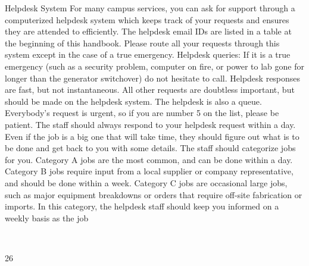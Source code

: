 \documentclass[a4paper,10pt]{article}
\begin{document}
Helpdesk System
For many campus services, you can ask for support through a computerized helpdesk system
which keeps track of your requests and ensures they are attended to efficiently. The
helpdesk email IDs are listed in a table at the beginning of this handbook. Please route all
your requests through this system except in the case of a true emergency.
Helpdesk queries: If it is a true emergency (such as a security problem, computer on fire, or
power to lab gone for longer than the generator switchover) do not hesitate to call. Helpdesk
responses are fast, but not instantaneous. All other requests are doubtless important, but
should be made on the helpdesk system.
The helpdesk is also a queue. Everybody's request is urgent, so if you are number 5 on the
list, please be patient.
The staff should always respond to your helpdesk request within a day. Even if the job is a
big one that will take time, they should figure out what is to be done and get back to you
with some details.
The staff should categorize jobs for you. Category A jobs are the most common, and can be
done within a day. Category B jobs require input from a local supplier or company
representative, and should be done within a week. Category C jobs are occasional large jobs,
such as major equipment breakdowns or orders that require off-site fabrication or imports. In
this category, the helpdesk staff should keep you informed on a weekly basis as the job
	
  

26	
  
\end{document}
